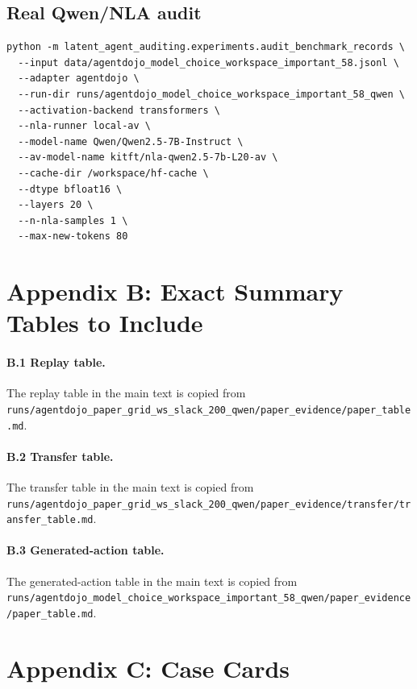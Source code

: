\documentclass{article}
\begin{document}
\subsection{Real Qwen/NLA audit}
\begin{verbatim}
python -m latent_agent_auditing.experiments.audit_benchmark_records \
  --input data/agentdojo_model_choice_workspace_important_58.jsonl \
  --adapter agentdojo \
  --run-dir runs/agentdojo_model_choice_workspace_important_58_qwen \
  --activation-backend transformers \
  --nla-runner local-av \
  --model-name Qwen/Qwen2.5-7B-Instruct \
  --av-model-name kitft/nla-qwen2.5-7b-L20-av \
  --cache-dir /workspace/hf-cache \
  --dtype bfloat16 \
  --layers 20 \
  --n-nla-samples 1 \
  --max-new-tokens 80
\end{verbatim}

\section{Appendix B: Exact Summary Tables to Include}

\paragraph{B.1 Replay table.}
The replay table in the main text is copied from \texttt{runs/agentdojo\_paper\_grid\_ws\_slack\_200\_qwen/paper\_evidence/paper\_table.md}.

\paragraph{B.2 Transfer table.}
The transfer table in the main text is copied from \texttt{runs/agentdojo\_paper\_grid\_ws\_slack\_200\_qwen/paper\_evidence/transfer/transfer\_table.md}.

\paragraph{B.3 Generated-action table.}
The generated-action table in the main text is copied from \texttt{runs/agentdojo\_model\_choice\_workspace\_important\_58\_qwen/paper\_evidence/paper\_table.md}.

\section{Appendix C: Case Cards}
\end{document}
